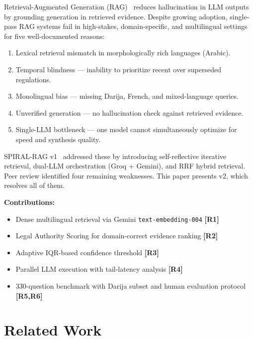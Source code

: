 \documentclass[12pt,a4paper]{article}
\begin{document}
Retrieval-Augmented Generation (RAG)~\cite{lewis2020rag} reduces hallucination
in LLM outputs by grounding generation in retrieved evidence. Despite growing
adoption, single-pass RAG systems fail in high-stakes, domain-specific, and
multilingual settings for five well-documented reasons:

\begin{enumerate}[leftmargin=*,nosep]
\item Lexical retrieval mismatch in morphologically rich languages (Arabic).
\item Temporal blindness — inability to prioritize recent over superseded regulations.
\item Monolingual bias — missing Darija, French, and mixed-language queries.
\item Unverified generation — no hallucination check against retrieved evidence.
\item Single-LLM bottleneck — one model cannot simultaneously optimize for speed and synthesis quality.
\end{enumerate}

SPIRAL-RAG v1~\cite{spiral_v1} addressed these by introducing self-reflective
iterative retrieval, dual-LLM orchestration (Groq + Gemini), and RRF hybrid
retrieval. Peer review identified four remaining weaknesses. This paper presents
v2, which resolves all of them.

\textbf{Contributions:}
\begin{itemize}[leftmargin=*,nosep]
\item Dense multilingual retrieval via Gemini \texttt{text-embedding-004} \textbf{[R1]}
\item Legal Authority Scoring for domain-correct evidence ranking \textbf{[R2]}
\item Adaptive IQR-based confidence threshold \textbf{[R3]}
\item Parallel LLM execution with tail-latency analysis \textbf{[R4]}
\item 330-question benchmark with Darija subset and human evaluation protocol \textbf{[R5,R6]}
\end{itemize}

\section{Related Work}
\label{sec:related}
\end{document}
